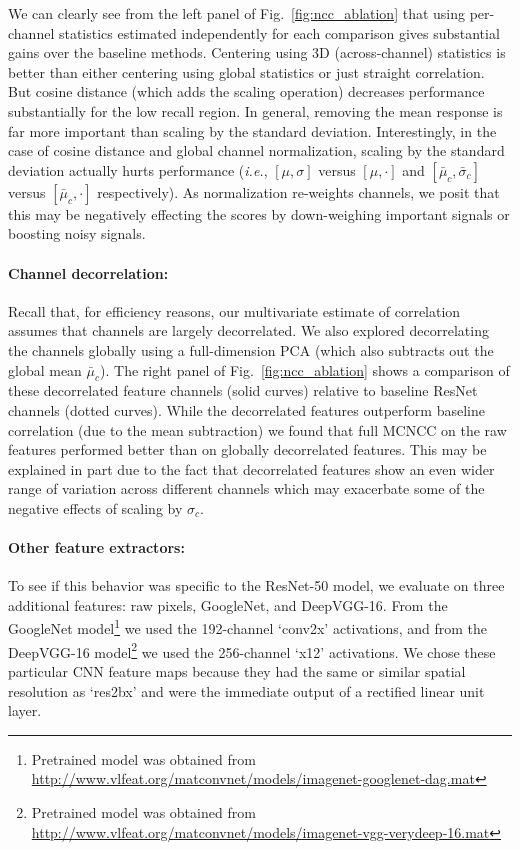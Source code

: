 \documentclass[twocolumn]{svjour3}           %
\newcommand{\ie}{\emph{i.e.}}
\begin{document}
We can clearly see from the left panel of Fig.~\ref{fig:ncc_ablation} that using
per-channel statistics estimated independently for each comparison gives
substantial gains over the baseline methods.  Centering using 3D
(across-channel) statistics is better than either centering using global
statistics or just straight correlation.  But cosine distance (which adds the
scaling operation) decreases performance substantially for the low recall
region. In general, removing the mean response is far more important than
scaling by the standard deviation.  Interestingly, in the case of cosine
distance and global channel normalization, scaling by the standard deviation
actually hurts performance (\ie, $[\mu,\sigma]$ versus $[\mu,\cdot]$ and
$[\bar{\mu}_c,\bar{\sigma}_c]$ versus $[\bar{\mu}_c,\cdot]$ respectively). As
normalization re-weights channels, we posit that this may be negatively
effecting the scores by down-weighing important signals or boosting noisy
signals.


\paragraph{Channel decorrelation:} Recall that, for efficiency reasons, our
multivariate estimate of correlation assumes that channels are largely
decorrelated.  We also explored decorrelating the channels globally using a
full-dimension PCA (which also subtracts out the global mean $\bar{\mu}_c$).
The right panel of Fig.~\ref{fig:ncc_ablation} shows a comparison of these
decorrelated feature channels (solid curves) relative to baseline ResNet
channels (dotted curves). While the decorrelated features outperform baseline
correlation (due to the mean subtraction) we found that full MCNCC on the raw
features performed better than on globally decorrelated features. This may be
explained in part due to the fact that decorrelated features show an even wider
range of variation across different channels which may exacerbate some of the
negative effects of scaling by $\sigma_c$.

\paragraph{Other feature extractors:}
To see if this behavior was specific to the ResNet-50 model, we evaluate on
three additional features: raw pixels, GoogleNet, and DeepVGG-16. From the
GoogleNet model\footnote{Pretrained model was obtained from
\url{http://www.vlfeat.org/matconvnet/models/imagenet-googlenet-dag.mat}} we
used the 192-channel `conv2x' activations, and from the DeepVGG-16
model\footnote{Pretrained model was obtained from
\url{http://www.vlfeat.org/matconvnet/models/imagenet-vgg-verydeep-16.mat}} we
used the 256-channel `x12' activations.
We chose these particular CNN feature maps because they had the same or similar
spatial resolution as `res2bx' and were the immediate output of a rectified
linear unit layer.
\end{document}

